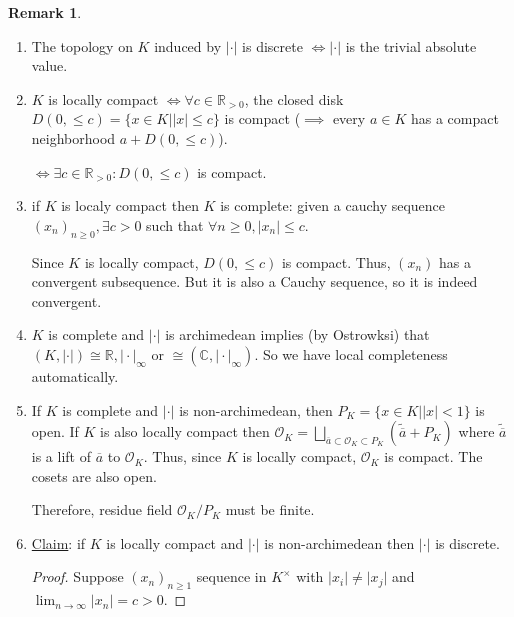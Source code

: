 \documentclass[openany]{amsbook}
\numberwithin{section}{chapter}
\theoremstyle{definition}
\newtheorem*{remark}{Remark}
\begin{document}
\begin{remark}
    \begin{enumerate}[label=\arabic*)]
        \item The topology on \(K\) induced by \(\vert \cdot \vert\) is discrete \(\iff \vert \cdot \vert\) is the trivial absolute value.
        \item \(K\) is locally compact \(\iff \forall c\in\mathbb{R}_{>0}\), the closed disk \(D(0,\leq c) = \{ x\in K \mid \vert x \vert \leq c \}\) is compact (\(\implies\) every \(a \in K\) has a compact neighborhood \(a+D(0,\leq c)\)).
        
        \(\iff \exists c\in \mathbb{R}_{>0}: D(0, \leq c)\) is compact.
        \item if \(K\) is localy compact then \(K\) is complete: given a cauchy sequence \((x_n)_{n \geq 0}, \exists c>0\) such that \(\forall n \geq 0, \vert x_n \vert \leq c\).
        
        Since \(K\) is locally compact, \(D(0,\leq c)\) is compact. Thus, \((x_n)\) has a convergent subsequence. But it is also a Cauchy sequence, so it is indeed convergent.

        \item \(K\) is complete and \(\vert \cdot \vert\) is archimedean implies (by Ostrowksi) that \((K,\vert \cdot \vert) \cong \mathbb{R} , \vert \cdot \vert_\infty\) or \(\cong (\mathbb{C}, \vert \cdot \vert_\infty)\). So we have local completeness automatically.
        \item If \(K\) is complete and \(\vert \cdot \vert\) is non-archimedean, then \(P_K = \{ x\in K \mid \vert x \vert < 1 \}\) is open. If \(K\) is also locally compact then \(\mathcal{O}_K = \bigsqcup_{\overline{a} \subset \mathcal{O}_K \subset P_K} (\widetilde{\overline{a}} + P_K)\) where \(\widetilde{\overline{a}}\) is a lift of \(\overline{a}\) to \(\mathcal{O}_K\). Thus, since \(K\) is locally compact, \(\mathcal{O}_K\) is compact. The cosets are also open.
        
        Therefore, residue field \(\mathcal{O}_K / P_K\) must be finite.

        \item \underline{Claim}: if \(K\) is locally compact and \(\vert \cdot \vert\) is non-archimedean then \(\vert \cdot \vert\) is discrete.
        
        \begin{proof}
            Suppose \((x_n)_{n \geq 1}\) sequence in \(K^\times\) with \(\vert x_i \vert \neq \vert x_j \vert\) and \(\lim_{n \to \infty} \vert x_n \vert = c > 0\).


\end{proof}
\end{enumerate}
\end{remark}
\end{document}

